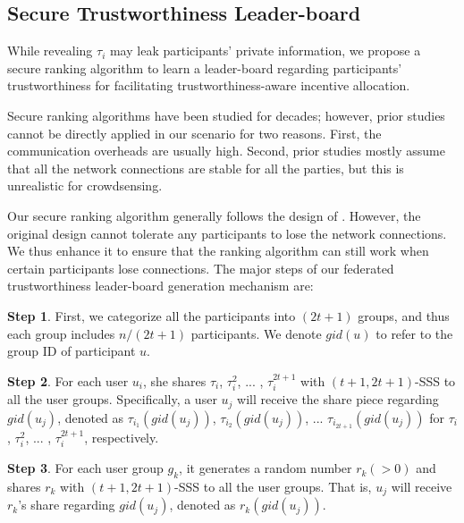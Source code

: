 \subsection{Secure Trustworthiness Leader-board}

While revealing $\tau_i$ may leak participants' private information, we propose a secure ranking algorithm to learn a  leader-board regarding participants' trustworthiness for facilitating trustworthiness-aware incentive allocation.

Secure ranking algorithms have been studied for decades; however, prior studies cannot be directly applied in our scenario for two reasons. First, the communication overheads are usually high. Second, prior studies mostly assume that all the network connections are stable for all the parties, but this is unrealistic for crowdsensing.

Our secure ranking algorithm generally follows the design of \citet{tang2011secure}. However, the original design \citep{tang2011secure} cannot tolerate any participants to lose the network connections. We thus enhance it to ensure that the ranking algorithm can still work when certain participants lose connections.
The major steps of our federated trustworthiness leader-board generation mechanism are:

\textbf{Step 1}. First, we categorize all the participants into $(2t+1)$ groups, and thus each group includes $n/(2t+1)$ participants. We denote $gid(u)$ to refer to the group ID of participant $u$.

\textbf{Step 2}. For each user $u_i$, she shares $\tau_i$, $\tau_i^2$, ... , $\tau_i^{2t+1}$ with $(t+1, 2t+1)$-SSS to all the user groups. Specifically, a user $u_j$ will receive the share piece regarding $gid(u_j)$, denoted as $\tau_{i_1}(gid(u_j))$, $\tau_{i_2}(gid(u_j))$, ... $\tau_{i_{2t+1}}(gid(u_j))$ for $\tau_i$, $\tau_i^2$, ... , $\tau_i^{2t+1}$, respectively.

\textbf{Step 3}. For each user group $g_k$, it generates a random number $r_k (>0)$ and shares $r_k$ with $(t+1, 2t+1)$-SSS to all the user groups. That is, $u_j$ will receive $r_k$'s share regarding $gid(u_j)$, denoted as $r_k(gid(u_j))$.

